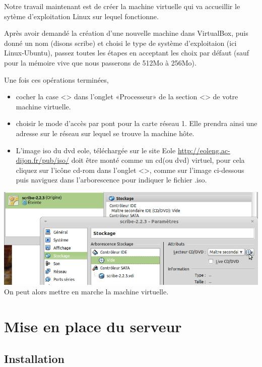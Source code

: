 \documentclass{article}
\makeatletter
\def\maxwidth{\ifdim\Gin@nat@width>\linewidth\linewidth
\else\Gin@nat@width\fi}
\let\Oldincludegraphics\includegraphics
\renewcommand{\includegraphics}[1]{\Oldincludegraphics[width=\maxwidth]{#1}}
\makeatother
\begin{document}
Notre travail maintenant est de créer la machine virtuelle qui va
accueillir le sytème d'exploitation Linux sur lequel fonctionne.

Après avoir demandé la création d'une nouvelle machine dans VirtualBox,
puis donné un nom (disons scribe) et choisi le type de système
d'exploitaion (ici Linux-Ubuntu), passez toutes les étapes en acceptant
les choix par défaut (sauf pour la mémoire vive que nous passerons de
512Mo à 256Mo).

Une fois ces opérations terminées,

\begin{itemize}
\item
  cocher la case \textless{}\textgreater{} dans l'onglet «Processeur» de
  la section \textless{}\textgreater{} de votre machine virtuelle.
\item
  choisir le mode d'accès par pont pour la carte réseau 1. Elle prendra
  ainsi une adresse sur le réseau sur lequel se trouve la machine hôte.
\item
  L'image iso du dvd eole, téléchargée sur le site Eole
  \url{http://eoleng.ac-dijon.fr/pub/iso/} doit être monté comme un
  cd(ou dvd) virtuel, pour cela cliquez sur l'icône cd-rom dans l'onglet
  \textless{}\textgreater{}, comme sur l'image ci-dessous puis naviguez
  dans l'arborescence pour indiquer le fichier .iso.
\end{itemize}
\includegraphics{scribe_html_m69a9bc5b.png}\\ On peut alors mettre en
marche la machine virtuelle.

\section{Mise en place du serveur}

\subsection{Installation}
\end{document}
